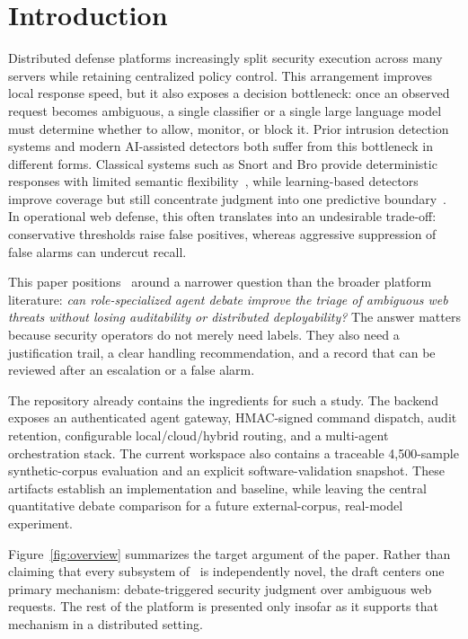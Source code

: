 \section{Introduction}\label{sec:introduction}

Distributed defense platforms increasingly split security execution across many servers while retaining centralized policy control. This arrangement improves local response speed, but it also exposes a decision bottleneck: once an observed request becomes ambiguous, a single classifier or a single large language model must determine whether to allow, monitor, or block it. Prior intrusion detection systems and modern AI-assisted detectors both suffer from this bottleneck in different forms. Classical systems such as Snort and Bro provide deterministic responses with limited semantic flexibility~\cite{roesch1999snort,paxson1999bro}, while learning-based detectors improve coverage but still concentrate judgment into one predictive boundary~\cite{doriguzzi2020lucid,neupane2022xids,holdbrook2024survey}. In operational web defense, this often translates into an undesirable trade-off: conservative thresholds raise false positives, whereas aggressive suppression of false alarms can undercut recall.

This paper positions \system\ around a narrower question than the broader platform literature: \emph{can role-specialized agent debate improve the triage of ambiguous web threats without losing auditability or distributed deployability?} The answer matters because security operators do not merely need labels. They also need a justification trail, a clear handling recommendation, and a record that can be reviewed after an escalation or a false alarm.

The repository already contains the ingredients for such a study. The backend exposes an authenticated agent gateway, HMAC-signed command dispatch, audit retention, configurable local/cloud/hybrid routing, and a multi-agent orchestration stack. The current workspace also contains a traceable 4,500-sample synthetic-corpus evaluation and an explicit software-validation snapshot. These artifacts establish an implementation and baseline, while leaving the central quantitative debate comparison for a future external-corpus, real-model experiment.

Figure~\ref{fig:overview} summarizes the target argument of the paper. Rather than claiming that every subsystem of \system\ is independently novel, the draft centers one primary mechanism: debate-triggered security judgment over ambiguous web requests. The rest of the platform is presented only insofar as it supports that mechanism in a distributed setting.

